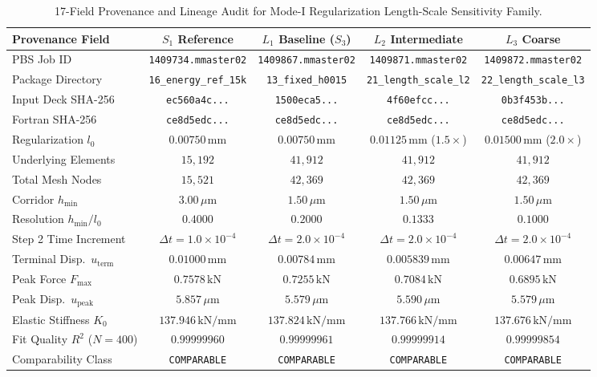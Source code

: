 \begin{table}[htbp]
  \centering
  \small
  \caption{17-Field Provenance and Lineage Audit for Mode-I Regularization Length-Scale Sensitivity Family.}
  \label{tab:stage14uaa_provenance_audit}
  \begin{tabular}{lcccc}
    \hline
    \textbf{Provenance Field} & \textbf{$S_1$ Reference} & \textbf{$L_1$ Baseline ($S_3$)} & \textbf{$L_2$ Intermediate} & \textbf{$L_3$ Coarse} \\
    \hline
    PBS Job ID & \texttt{1409734.mmaster02} & \texttt{1409867.mmaster02} & \texttt{1409871.mmaster02} & \texttt{1409872.mmaster02} \\
    Package Directory & \texttt{16\_energy\_ref\_15k} & \texttt{13\_fixed\_h0015} & \texttt{21\_length\_scale\_l2} & \texttt{22\_length\_scale\_l3} \\
    Input Deck SHA-256 & \texttt{ec560a4c...} & \texttt{1500eca5...} & \texttt{4f60efcc...} & \texttt{0b3f453b...} \\
    Fortran SHA-256 & \texttt{ce8d5edc...} & \texttt{ce8d5edc...} & \texttt{ce8d5edc...} & \texttt{ce8d5edc...} \\
    Regularization $l_0$ & $0.00750\,\mathrm{mm}$ & $0.00750\,\mathrm{mm}$ & $0.01125\,\mathrm{mm}$ ($1.5\times$) & $0.01500\,\mathrm{mm}$ ($2.0\times$) \\
    Underlying Elements & $15{,}192$ & $41{,}912$ & $41{,}912$ & $41{,}912$ \\
    Total Mesh Nodes & $15{,}521$ & $42{,}369$ & $42{,}369$ & $42{,}369$ \\
    Corridor $h_{\min}$ & $3.00\,\mu\mathrm{m}$ & $1.50\,\mu\mathrm{m}$ & $1.50\,\mu\mathrm{m}$ & $1.50\,\mu\mathrm{m}$ \\
    Resolution $h_{\min}/l_0$ & $0.4000$ & $0.2000$ & $0.1333$ & $0.1000$ \\
    Step 2 Time Increment & $\Delta t = 1.0\times 10^{-4}$ & $\Delta t = 2.0\times 10^{-4}$ & $\Delta t = 2.0\times 10^{-4}$ & $\Delta t = 2.0\times 10^{-4}$ \\
    Terminal Disp.\ $u_{\text{term}}$ & $0.01000\,\mathrm{mm}$ & $0.00784\,\mathrm{mm}$ & $0.005839\,\mathrm{mm}$ & $0.00647\,\mathrm{mm}$ \\
    Peak Force $F_{\max}$ & $0.7578\,\mathrm{kN}$ & $0.7255\,\mathrm{kN}$ & $0.7084\,\mathrm{kN}$ & $0.6895\,\mathrm{kN}$ \\
    Peak Disp.\ $u_{\text{peak}}$ & $5.857\,\mu\mathrm{m}$ & $5.579\,\mu\mathrm{m}$ & $5.590\,\mu\mathrm{m}$ & $5.579\,\mu\mathrm{m}$ \\
    Elastic Stiffness $K_0$ & $137.946\,\mathrm{kN/mm}$ & $137.824\,\mathrm{kN/mm}$ & $137.766\,\mathrm{kN/mm}$ & $137.676\,\mathrm{kN/mm}$ \\
    Fit Quality $R^2$ ($N=400$) & $0.99999960$ & $0.99999961$ & $0.99999914$ & $0.99999854$ \\
    Comparability Class & \texttt{COMPARABLE} & \texttt{COMPARABLE} & \texttt{COMPARABLE} & \texttt{COMPARABLE} \\
    \hline
  \end{tabular}
\end{table}

